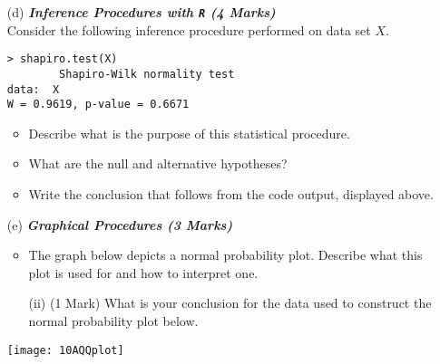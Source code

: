 \newpage
\begin{itemize}
\item[(d)] \textbf{\textit{ Inference Procedures with \texttt{R} (4 Marks)}}\\
Consider the following inference procedure performed on data set $X$.
\begin{center}
\begin{framed}
\begin{verbatim}
> shapiro.test(X)
        Shapiro-Wilk normality test
data:  X
W = 0.9619, p-value = 0.6671
\end{verbatim}
\end{framed}
\end{center}

\begin{itemize}
\item  Describe what is the purpose of this statistical procedure.
\item  What are the null and alternative hypotheses?
\item  Write the conclusion that follows from the code output, displayed above.
\end{itemize}
\end{itemize}

\begin{itemize}
\item[(e)] \textbf{\textit{Graphical Procedures (3 Marks)}}
\begin{itemize}
\item  The graph below depicts a normal probability plot. Describe what this plot is used for and how to interpret one.
\item[(ii)](1 Mark) What is your conclusion for the data used to construct the normal probability plot below.
\end{itemize}
\begin{center}
\texttt{[image: 10AQQplot]}
\end{center}


\end{itemize}
